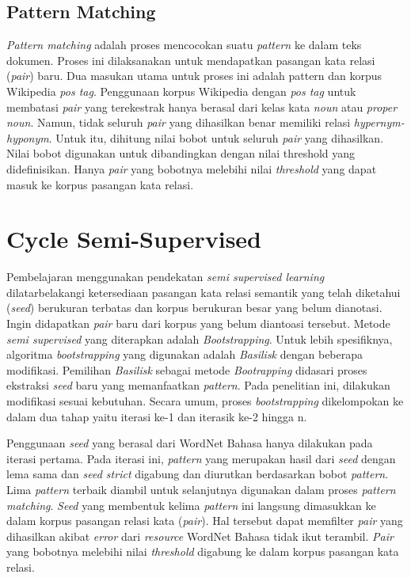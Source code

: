 \subsection{Pattern Matching}
\textit{Pattern matching} adalah proses mencocokan suatu \textit{pattern} ke dalam teks dokumen. Proses ini dilaksanakan untuk mendapatkan pasangan kata relasi (\textit{pair}) baru. Dua masukan utama untuk proses ini adalah pattern dan korpus Wikipedia \textit{pos tag}. Penggunaan korpus Wikipedia dengan \textit{pos tag} untuk membatasi \textit{pair} yang terekestrak hanya berasal dari kelas kata \textit{noun} atau \textit{proper noun}. Namun, tidak seluruh \textit{pair} yang dihasilkan benar memiliki relasi \textit{hypernym-hyponym}. Untuk itu, dihitung nilai bobot untuk seluruh \textit{pair} yang dihasilkan. Nilai bobot digunakan untuk dibandingkan dengan nilai threshold yang didefinisikan. Hanya \textit{pair} yang bobotnya melebihi nilai \textit{threshold} yang dapat masuk ke korpus pasangan kata relasi.


\section{Cycle Semi-Supervised}
Pembelajaran menggunakan pendekatan \textit{semi supervised learning} dilatarbelakangi ketersediaan pasangan kata relasi semantik yang telah diketahui (\textit{seed}) berukuran terbatas dan korpus berukuran besar yang belum dianotasi. Ingin didapatkan \textit{pair} baru dari korpus yang belum diantoasi tersebut. Metode \textit{semi supervised} yang diterapkan adalah \textit{Bootstrapping}. Untuk lebih spesifiknya, algoritma \textit{bootstrapping} yang digunakan adalah \textit{Basilisk} dengan beberapa modifikasi. Pemilihan \textit{Basilisk} sebagai metode \textit{Bootrapping} didasari proses ekstraksi \textit{seed} baru yang memanfaatkan \textit{pattern}. Pada penelitian ini, dilakukan modifikasi sesuai kebutuhan. Secara umum, proses \textit{bootstrapping} dikelompokan ke dalam dua tahap yaitu iterasi ke-1 dan iterasik ke-2 hingga n.

Penggunaan \textit{seed} yang berasal dari WordNet Bahasa hanya dilakukan pada iterasi pertama. Pada iterasi ini, \textit{pattern} yang merupakan hasil dari \textit{seed} dengan lema sama dan \textit{seed strict} digabung dan diurutkan berdasarkan bobot \textit{pattern}. Lima \textit{pattern} terbaik diambil untuk selanjutnya digunakan dalam proses \textit{pattern matching}. \textit{Seed} yang membentuk kelima \textit{pattern} ini langsung dimasukkan ke dalam korpus pasangan relasi kata (\textit{pair}). Hal tersebut dapat memfilter \textit{pair} yang dihasilkan akibat \textit{error} dari \textit{resource} WordNet Bahasa tidak ikut terambil. \textit{Pair} yang bobotnya melebihi nilai \textit{threshold} digabung ke dalam korpus pasangan kata relasi. 

